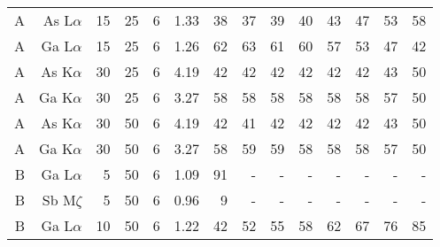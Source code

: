 \begin{table}[phtb]
\begin{center}
\begin{tabular}{rrrrrrrrrrrrrr}
            A            & As L$\alpha$  & 15             & 25             & 6           & 1.33              & 38                 & 37           & 39            & 40             & 43             & 47             & 53            & 58             \\
            A            & Ga L$\alpha$  & 15             & 25             & 6           & 1.26              & 62                 & 63           & 61            & 60             & 57             & 53             & 47            & 42             \\
            A            & As K$\alpha$  & 30             & 25             & 6           & 4.19              & 42                 & 42           & 42            & 42             & 42             & 42             & 43            & 50             \\
            A            & Ga K$\alpha$  & 30             & 25             & 6           & 3.27              & 58                 & 58           & 58            & 58             & 58             & 58             & 57            & 50             \\
            A            & As K$\alpha$  & 30             & 50             & 6           & 4.19              & 42                 & 41           & 42            & 42             & 42             & 42             & 43            & 50             \\
            A            & Ga K$\alpha$  & 30             & 50             & 6           & 3.27              & 58                 & 59           & 59            & 58             & 58             & 58             & 57            & 50             \\
            \hline
            B            & Ga L$\alpha$  & 5              & 50             & 6           & 1.09              & 91                 & -            & -             & -              & -              & -              & -             & -              \\
            B            & Sb M$\zeta$   & 5              & 50             & 6           & 0.96              & 9                  & -            & -             & -              & -              & -              & -             & -              \\
            B            & Ga L$\alpha$  & 10             & 50             & 6           & 1.22              & 42                 & 52           & 55            & 58             & 62             & 67             & 76            & 85             \\

\end{tabular}
\end{center}
\end{table}
